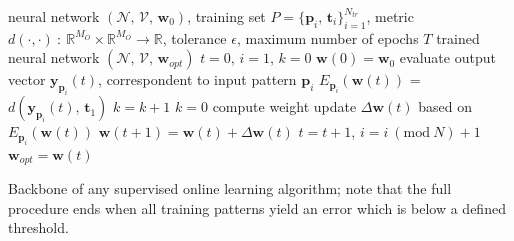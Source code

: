 \documentclass[12pt, a4paper, twoside, openright]{report}
\numberwithin{equation}{chapter}
\theoremstyle{theorem}
\theoremstyle{definition}
\theoremstyle{remark}
\theoremstyle{proposition}
\numberwithin{figure}{chapter}
\newcommand{\Mod}[1]{\ (\mathrm{mod}\ #1)}
\newcommand{\bg}[1]{\boldsymbol{#1}}
\begin{document}
		\begin{algorithm}[t]
			\begin{algorithmic}[1]
				\Require neural network $\left( \mathcal{N}, \, \mathcal{V}, \, \bg{w}_0 \right)$, training set $P = \big\lbrace \bg{p}_i, \, \bg{t}_i \big\rbrace_{i = 1}^{N_{tr}}$, 
				\Statex \hspace*{0.535cm} metric $d(\cdot,\cdot) ~ : ~ \mathbb{R}^{M_O} \times \mathbb{R}^{M_O} \rightarrow \mathbb{R}$, tolerance $\epsilon$, maximum number of epochs $T$
				\Ensure trained neural network $\left( \mathcal{N}, \, \mathcal{V}, \, \bg{w}_{opt} \right)$
				\vspace*{0.2cm}
				\State $t = 0$, $i = 1$, $k = 0$
				\State $\bg{w}(0) = \bg{w}_0$
					\State evaluate output vector $\bg{y}_{\bg{p}_i}(t)$, correspondent to input pattern $\bg{p}_i$
					\State $E_{\bg{p}_i}(\bg{w}(t))$ = $d(\bg{y}_{\bg{p}_i}(t), \, \bg{t}_1)$
					\If{$E_{\bg{p}_i}(\bg{w}(t)) < \epsilon$}
						\State $k = k + 1$
					\Else
						\State $k = 0$
						\State compute weight update $\Delta \bg{w}(t)$ based on $E_{\bg{p}_i}(\bg{w}(t))$
						\State $\bg{w}(t+1) = \bg{w}(t) + \Delta \bg{w}(t)$
					\EndIf
					\State $t = t+1$, $i = i \Mod N + 1$					
				\EndWhile		
				\State $\bg{w}_{opt} = \bg{w}(t)$
			\end{algorithmic}
			
			\caption{Backbone of any supervised online learning algorithm; note that the full procedure ends when all training patterns yield an error which is below a defined threshold.}
			\label{alg:online-learning}
		\end{algorithm}
\end{document}

